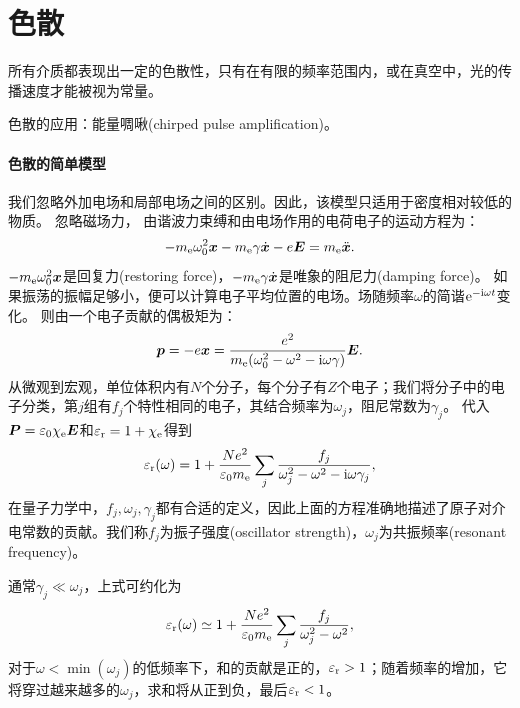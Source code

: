 
\section{色散}

所有介质都表现出一定的色散性，只有在有限的频率范围内，或在真空中，光的传播速度才能被视为常量。

色散的应用：能量啁啾(chirped pulse amplification)。
\paragraph{色散的简单模型}
我们忽略外加电场和局部电场之间的区别。因此，该模型只适用于密度相对较低的物质。
忽略磁场力，
由谐波力束缚和由电场作用的电荷电子的运动方程为：
\[
    -m_\mathrm e\omega_0^2\bm x-m_\mathrm e\gamma\dot{\bm x}-e\bm E=m_\mathrm e\ddot{\bm x}.
\]
$-m_\mathrm e\omega_0^2\bm x$是回复力(restoring force)，$-m_\mathrm e\gamma\dot{\bm x}$是唯象的阻尼力(damping force)。
如果振荡的振幅足够小，便可以计算电子平均位置的电场。场随频率$\omega$的简谐$\mathop{}\!\mathrm{e}^{-\mathrm{i}\omega t}$变化。
则由一个电子贡献的偶极矩为：
\[
    \bm p=-e\bm x=\frac{e^2}{m_\mathrm e(\omega_0^2-\omega^2-\mathrm{i}\omega\gamma)}\bm E.
\]
从微观到宏观，单位体积内有$N$个分子，每个分子有$Z$个电子；我们将分子中的电子分类，第$j$组有$f_j$个特性相同的电子，其结合频率为$\omega_j$，阻尼常数为$\gamma_j$。
代入$\bm P=\varepsilon_0\chi_\mathrm e\bm E$和$\varepsilon_\text r=1+\chi_\mathrm e$得到
\begin{equation}
    \varepsilon_\text r(\omega)=1+\frac{Ne^2}{\varepsilon_0m_\mathrm e}\sum_j\frac{f_j}{\omega_j^2-\omega^2-\mathrm{i}\omega\gamma_j},
\end{equation}
在量子力学中，$f_j,\omega_j,\gamma_j$都有合适的定义，因此上面的方程准确地描述了原子对介电常数的贡献。我们称$f_j$为振子强度(oscillator strength)，$\omega_j$为共振频率(resonant frequency)。

通常$\gamma_j\ll\omega_j$，上式可约化为
\[
    \varepsilon_\text r(\omega)\simeq 1+\frac{Ne^2}{\varepsilon_0m_\mathrm e}\sum_j\frac{f_j}{\omega_j^2-\omega^2},
\]
对于$\omega<\min(\omega_j)$的低频率下，和的贡献是正的，$\varepsilon_\text r>1$；随着频率的增加，它将穿过越来越多的$\omega_j$，求和将从正到负，最后$\varepsilon_\text r<1$。

